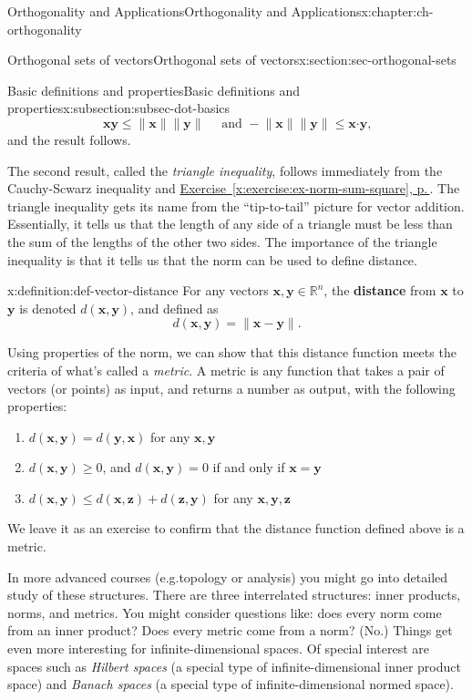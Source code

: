 \documentclass[oneside,10pt,]{book}
\newcommand{\xreffont}{\relax}
\newcommand{\terminology}[1]{\textbf{#1}}
\numberwithin{equation}{section}
\newcommand{\R}{\mathbb{R}}
\newcommand{\dotp}{\!\boldsymbol{\cdot}\!}
\newcommand{\len}[1]{\lVert #1\rVert}
\newcommand{\zz}{\mathbf{z}}
\newcommand{\xx}{\mathbf{x}}
\newcommand{\yy}{\mathbf{y}}
\begin{document}
\begin{chapterptx}{Orthogonality and Applications}{}{Orthogonality and Applications}{}{}{x:chapter:ch-orthogonality}
\begin{sectionptx}{Orthogonal sets of vectors}{}{Orthogonal sets of vectors}{}{}{x:section:sec-orthogonal-sets}
\begin{subsectionptx}{Basic definitions and properties}{}{Basic definitions and properties}{}{}{x:subsection:subsec-dot-basics}
\begin{equation*}
\xx\yy\leq \len{\xx}\len{\yy} \quad \text{ and } -\len{\xx}\len{\yy}\leq \xx\dotp\yy\text{,}
\end{equation*}
and the result follows.%
\par
The second result, called the  \emph{triangle inequality}, follows immediately from the Cauchy-Scwarz inequality and \hyperref[x:exercise:ex-norm-sum-square]{Exercise~{\xreffont\ref{x:exercise:ex-norm-sum-square}}, p.\,\pageref{x:exercise:ex-norm-sum-square}}. The triangle inequality gets its name from the ``tip-to-tail'' picture for vector addition. Essentially, it tells us that the length of any side of a triangle must be less than the sum of the lengths of the other two sides. The importance of the triangle inequality is that it tells us that the norm can be used to define distance.%
\begin{definition}{}{x:definition:def-vector-distance}%
For any vectors \(\xx,\yy\in \R^n\), the \terminology{distance} from \(\xx\) to \(\yy\) is denoted \(d(\xx,\yy)\), and defined as%
\begin{equation*}
d(\xx,\yy) = \len{\xx-\yy}\text{.}
\end{equation*}
%
\end{definition}
Using properties of the norm, we can show that this distance function meets the criteria of what's called a \emph{metric}. A metric is any function that takes a pair of vectors (or points) as input, and returns a number as output, with the following properties:%
\begin{enumerate}
\item{}\(d(\xx,\yy)=d(\yy,\xx)\) for any \(\xx,\yy\)%
\item{}\(d(\xx,\yy)\geq 0\), and \(d(\xx,\yy)=0\) if and only if \(\xx=\yy\)%
\item{}\(d(\xx,\yy)\leq d(\xx,\zz)+d(\zz,\yy)\) for any \(\xx,\yy,\zz\)%
\end{enumerate}
We leave it as an exercise to confirm that the distance function defined above is a metric.%
\par
In more advanced courses (e.g.\@ topology or analysis) you might go into detailed study of these structures. There are three interrelated structures: inner products, norms, and metrics. You might consider questions like: does every norm come from an inner product? Does every metric come from a norm? (No.) Things get even more interesting for infinite-dimensional spaces. Of special interest are spaces such as \emph{Hilbert spaces} (a special type of infinite-dimensional inner product space) and \emph{Banach spaces} (a special type of infinite-dimensional normed space).%

\end{subsectionptx}
\end{sectionptx}
\end{chapterptx}
\end{document}
